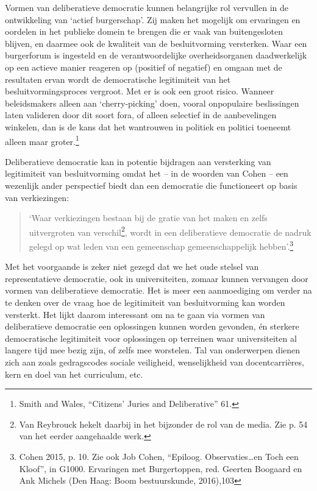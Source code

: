 \documentclass{jote-book}
\begin{document}
	Vormen van deliberatieve democratie kunnen belangrijke rol vervullen in de ontwikkeling van ‘actief burgerschap'. Zij maken het mogelijk om ervaringen en oordelen in het publieke domein te brengen die er vaak van buitengesloten blijven, en daarmee ook de kwaliteit van de besluitvorming versterken. Waar een burgerforum is ingesteld en de verantwoordelijke overheidsorganen daadwerkelijk op een actieve manier reageren op (positief of negatief) en omgaan met de resultaten ervan wordt de democratische legitimiteit van het besluitvormingsproces vergroot. Met er is ook een groot risico. Wanneer beleidsmakers alleen aan ‘cherry-picking' doen, vooral onpopulaire beslissingen laten valideren door dit soort fora, of alleen selectief in de aanbevelingen winkelen, dan is de kans dat het wantrouwen in politiek en politici toeneemt alleen maar groter.\footnote{Smith and Wales, “Citizens' Juries and Deliberative” 61.}



	Deliberatieve democratie kan in potentie bijdragen aan versterking van legitimiteit van besluitvorming omdat het -- in de woorden van Cohen -- een wezenlijk ander perspectief biedt dan een democratie die functioneert op basis van verkiezingen:

	\begin{quote}
		\itshape

		‘Waar verkiezingen bestaan bij de gratie van het maken en zelfs uitvergroten van verschil\footnote{Van Reybrouck hekelt daarbij in het bijzonder de rol van de media. Zie p. 54 van het eerder aangehaalde werk.}, wordt in een deliberatieve democratie de nadruk gelegd op wat leden van een gemeenschap gemeenschappelijk hebben'.\footnote{Cohen 2015, p. 10. Zie ook Job Cohen, “Epiloog. Observaties…en Toch een Kloof”, in G1000. Ervaringen met Burgertoppen, red. Geerten Boogaard en Ank Michels (Den Haag: Boom bestuurskunde, 2016),103}
	\end{quote}

	Met het voorgaande is zeker niet gezegd dat we het oude stelsel van representatieve democratie, ook in universiteiten, zomaar kunnen vervangen door vormen van deliberatieve democratie. Het is meer een aanmoediging om verder na te denken over de vraag hoe de legitimiteit van besluitvorming kan worden versterkt. Het lijkt daarom interessant om na te gaan via vormen van deliberatieve democratie een oplossingen kunnen worden gevonden, én sterkere democratische legitimiteit voor oplossingen op terreinen waar universiteiten al langere tijd mee bezig zijn, of zelfs mee worstelen. Tal van onderwerpen dienen zich aan zoals gedragscodes sociale veiligheid, wenselijkheid van docentcarrières, kern en doel van het curriculum, etc.
\end{document}
